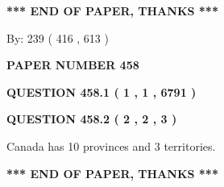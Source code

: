\documentclass[12pt]{article}
\begin{document}
 
 
 
   
   
 \vspace{0.2in}
 
   
   
   
   
\vspace{1.0in} 
{\textbf{\large{ *** END OF PAPER, THANKS *** }}} 
   
   
\hspace{1.0in} By: 
 239 ( 416 ,  613 )
   
   
   
   
\newpage 
\setcounter{page}{ 
   458001 } 
   
   
   
   
 {\textbf{ \Large{ PAPER NUMBER  458  }}}
   
   
\vspace{0.2in}
   
   
   
   
   
   
 \vspace{0.2in}
 
 
 
 
   
   
  
\vspace{0.2in}
  
{\textbf{\Large{QUESTION
458.1 
 ( 1 , 1 , 6791 )
}}}
  
  
  
\vspace{0.2in}
  
{\textbf{\Large{QUESTION
458.2 
 ( 2 , 2 , 3 )
}}}
  
  
 
 
\noindent{}
 
 
Canada has 10  provinces and 3 territories.
 
 
 
 
   
   
 \vspace{0.2in}
 
   
   
   
   
\vspace{1.0in} 
{\textbf{\large{ *** END OF PAPER, THANKS *** }}} 
   
\end{document}
